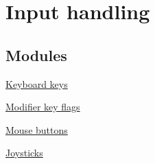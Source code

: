 \hypertarget{group__input}{\section{Input handling}
\label{group__input}
}
\subsection*{Modules}
\begin{DoxyCompactItemize}
\item 
\hyperlink{group__keys}{Keyboard keys}
\item 
\hyperlink{group__mods}{Modifier key flags}
\item 
\hyperlink{group__buttons}{Mouse buttons}
\item 
\hyperlink{group__joysticks}{Joysticks}
\end{DoxyCompactItemize}
